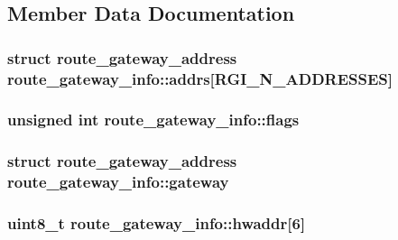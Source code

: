 \subsection{Member Data Documentation}
\hypertarget{structroute__gateway__info_a821e9fd19ddaef85c9c5728d68429029}{}
\subsubsection[{addrs}]{\setlength{\rightskip}{0pt plus 5cm}struct {\bf route\+\_\+gateway\+\_\+address} route\+\_\+gateway\+\_\+info\+::addrs\mbox{[}{\bf R\+G\+I\+\_\+\+N\+\_\+\+A\+D\+D\+R\+E\+S\+S\+E\+S}\mbox{]}}\label{structroute__gateway__info_a821e9fd19ddaef85c9c5728d68429029}
\hypertarget{structroute__gateway__info_a28486a8aae1940b41d6969c926446820}{}
\subsubsection[{flags}]{\setlength{\rightskip}{0pt plus 5cm}unsigned int route\+\_\+gateway\+\_\+info\+::flags}\label{structroute__gateway__info_a28486a8aae1940b41d6969c926446820}
\hypertarget{structroute__gateway__info_ab9e341920923382cc32079487eca6e62}{}
\subsubsection[{gateway}]{\setlength{\rightskip}{0pt plus 5cm}struct {\bf route\+\_\+gateway\+\_\+address} route\+\_\+gateway\+\_\+info\+::gateway}\label{structroute__gateway__info_ab9e341920923382cc32079487eca6e62}
\hypertarget{structroute__gateway__info_a085f4be76e2215ac99ab2a7651513f8e}{}
\subsubsection[{hwaddr}]{\setlength{\rightskip}{0pt plus 5cm}uint8\+\_\+t route\+\_\+gateway\+\_\+info\+::hwaddr\mbox{[}6\mbox{]}}\label{structroute__gateway__info_a085f4be76e2215ac99ab2a7651513f8e}
\hypertarget{structroute__gateway__info_aaf17695926fe4ba822c86256742f005b}{}
